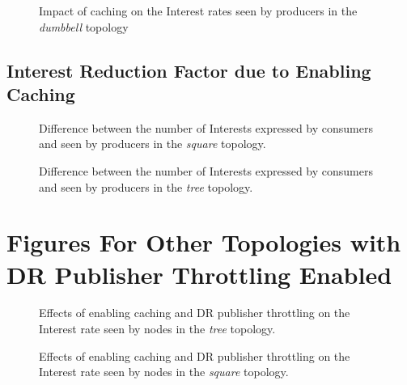 \begin{appendices}
\begin{figure}[H]
    \centering
    \caption{Impact of caching on the Interest rates seen by producers in the \textit{dumbbell} topology}
\end{figure}

\section{Interest Reduction Factor due to Enabling Caching}
\begin{figure}[H]
    \centering
    \caption{Difference between the number of Interests expressed by consumers and seen by producers in the \textit{square} topology. }
\end{figure}
\begin{figure}[H]
    \centering
    \caption{Difference between the number of Interests expressed by consumers and seen by producers in the \textit{tree} topology. }
\end{figure}

\chapter{Figures For Other Topologies with DR Publisher Throttling Enabled}\label{app:eval:pub-throt}

\begin{figure}[H]
    \centering
    \caption{Effects of enabling caching and DR publisher throttling on the Interest rate seen by nodes in the \textit{tree} topology.}
    \label{fig:app:caching:dr-pub-throt-tree}
\end{figure}

\begin{figure}[H]
    \centering
    \caption{Effects of enabling caching and DR publisher throttling on the Interest rate seen by nodes in the \textit{square} topology.}
    \label{fig:app:caching:dr-pub-throt-square}
\end{figure}

\end{appendices}